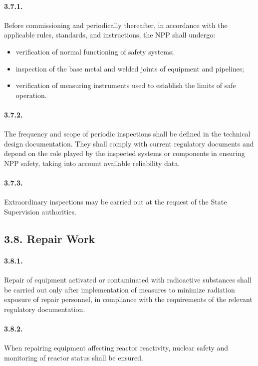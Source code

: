 \documentclass[openright]{bookest}
\begin{document}
\paragraph{3.7.1.}
Before commissioning and periodically thereafter, in accordance with the applicable rules, standards, and instructions, the NPP shall undergo:
\begin{itemize}
    \item verification of normal functioning of safety systems;
    \item inspection of the base metal and welded joints of equipment and pipelines;
    \item verification of measuring instruments used to establish the limits of safe operation.
\end{itemize}

\paragraph{3.7.2.}
The frequency and scope of periodic inspections shall be defined in the technical design documentation.  
They shall comply with current regulatory documents and depend on the role played by the inspected systems or components in ensuring NPP safety, taking into account available reliability data.

\paragraph{3.7.3.}
Extraordinary inspections may be carried out at the request of the State Supervision authorities.

\subsection*{3.8. Repair Work}

\paragraph{3.8.1.}
Repair of equipment activated or contaminated with radioactive substances shall be carried out only after implementation of measures to minimize radiation exposure of repair personnel, in compliance with the requirements of the relevant regulatory documentation.

\paragraph{3.8.2.}
When repairing equipment affecting reactor reactivity, nuclear safety and monitoring of reactor status shall be ensured.
\end{document}

